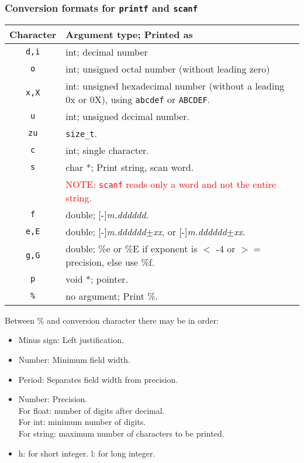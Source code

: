 \subsubsection{Conversion formats for \texttt{printf} and \texttt{scanf}}
\begin{tabularx}{\linewidth}{c|X}
\hline 
\textbf{Character} & \textbf{Argument type; Printed as}\\
\hline
\texttt{d,i} & int; decimal number\\
\texttt{o} & int; unsigned octal number (without leading zero)\\
\texttt{x,X} & int: unsigned hexadecimal number (without a leading 0x or 0X), using \texttt{abcdef} or \texttt{ABCDEF}.\\
\texttt{u} & int; unsigned decimal number.\\
\texttt{zu} & \texttt{size\_t}.\\
\texttt{c} & int; single character.\\
\texttt{s} & char *; Print string, scan word.\\
& \textcolor{red}{NOTE: \texttt{scanf} reads only a word and not the entire string.}\\
\texttt{f} & double; [-]\textit{m.dddddd}.\\
\texttt{e,E} & double; [-]\textit{m.dddddd}$\pm$\textit{xx}, or [-]\textit{m.dddddd}$\pm$\textit{xx}.\\
\texttt{g,G} & double; \%e or \%E if exponent is $<$ -4 or $>=$ precision, else use \%f.\\
\texttt{p} & void *; pointer.\\
\texttt{\%} & no argument; Print \%.\\
\hline
\end{tabularx}

Between \% and conversion character there may be in order:\\
\begin{itemize}
\item Minus sign: Left justification.
\item Number: Minimum field width.
\item Period: Separates field width from precision.
\item Number: Precision. \\
	For float: number of digits after decimal.\\
	For int: minimum number of digits.\\
	For string: maximum number of characters to be printed.\\ 
\item h: for short integer.
	l: for long integer.\\
\end{itemize}


